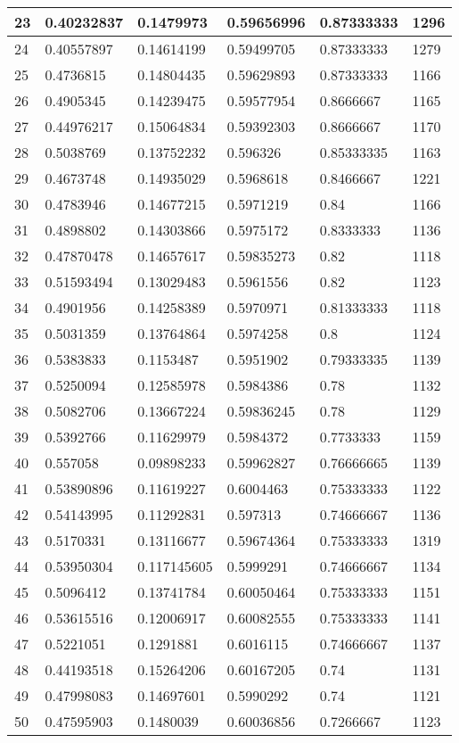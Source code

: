 \begin{longtable}{|l|l|l|l|l|l|}
23 & 0.40232837 & 0.1479973 & 0.59656996 & 0.87333333 & 1296 \\ \hline 
24 & 0.40557897 & 0.14614199 & 0.59499705 & 0.87333333 & 1279 \\ \hline 
25 & 0.4736815 & 0.14804435 & 0.59629893 & 0.87333333 & 1166 \\ \hline 
26 & 0.4905345 & 0.14239475 & 0.59577954 & 0.8666667 & 1165 \\ \hline 
27 & 0.44976217 & 0.15064834 & 0.59392303 & 0.8666667 & 1170 \\ \hline 
28 & 0.5038769 & 0.13752232 & 0.596326 & 0.85333335 & 1163 \\ \hline 
29 & 0.4673748 & 0.14935029 & 0.5968618 & 0.8466667 & 1221 \\ \hline 
30 & 0.4783946 & 0.14677215 & 0.5971219 & 0.84 & 1166 \\ \hline 
31 & 0.4898802 & 0.14303866 & 0.5975172 & 0.8333333 & 1136 \\ \hline 
32 & 0.47870478 & 0.14657617 & 0.59835273 & 0.82 & 1118 \\ \hline 
33 & 0.51593494 & 0.13029483 & 0.5961556 & 0.82 & 1123 \\ \hline 
34 & 0.4901956 & 0.14258389 & 0.5970971 & 0.81333333 & 1118 \\ \hline 
35 & 0.5031359 & 0.13764864 & 0.5974258 & 0.8 & 1124 \\ \hline 
36 & 0.5383833 & 0.1153487 & 0.5951902 & 0.79333335 & 1139 \\ \hline 
37 & 0.5250094 & 0.12585978 & 0.5984386 & 0.78 & 1132 \\ \hline 
38 & 0.5082706 & 0.13667224 & 0.59836245 & 0.78 & 1129 \\ \hline 
39 & 0.5392766 & 0.11629979 & 0.5984372 & 0.7733333 & 1159 \\ \hline 
40 & 0.557058 & 0.09898233 & 0.59962827 & 0.76666665 & 1139 \\ \hline 
41 & 0.53890896 & 0.11619227 & 0.6004463 & 0.75333333 & 1122 \\ \hline 
42 & 0.54143995 & 0.11292831 & 0.597313 & 0.74666667 & 1136 \\ \hline 
43 & 0.5170331 & 0.13116677 & 0.59674364 & 0.75333333 & 1319 \\ \hline 
44 & 0.53950304 & 0.117145605 & 0.5999291 & 0.74666667 & 1134 \\ \hline 
45 & 0.5096412 & 0.13741784 & 0.60050464 & 0.75333333 & 1151 \\ \hline 
46 & 0.53615516 & 0.12006917 & 0.60082555 & 0.75333333 & 1141 \\ \hline 
47 & 0.5221051 & 0.1291881 & 0.6016115 & 0.74666667 & 1137 \\ \hline 
48 & 0.44193518 & 0.15264206 & 0.60167205 & 0.74 & 1131 \\ \hline 
49 & 0.47998083 & 0.14697601 & 0.5990292 & 0.74 & 1121 \\ \hline 
50 & 0.47595903 & 0.1480039 & 0.60036856 & 0.7266667 & 1123 \\ \hline 
\end{longtable}
